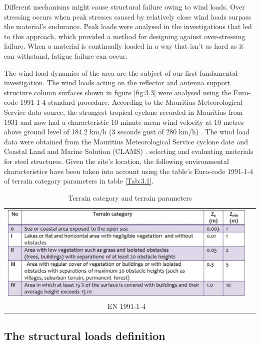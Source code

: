 { Different mechanisms might cause structural failure owing to wind loads. Over stressing occurs when peak stresses caused by relatively close wind loads surpass the material's endurance. Peak loads were analysed in the investigations that led to this approach, which provided a method for designing against over-stressing failure. When a material is continually loaded in a way that isn't as hard as it can withstand, fatigue failure can occur. 
 
The wind load dynamics of the area are the subject of our first fundamental investigation. The wind loads acting on the reflector and antenna support structure column surfaces shown in figure \ref{fig:3.3} were analysed using the Euro-code 1991-1-4 \cite {en19911} standard procedure. According to the Mauritius Meteorological Service data source, the strongest tropical cyclone recorded in Mauritius from 1931 and now had a characteristic 10 minute mean wind velocity at 10 metres above ground level of 184.2 km/h (3 seconds gust of 280 km/h) \cite{mms_2020}. The wind load data were obtained from the Mauritius Meteorological Service cyclone date \cite{mms_2020} and Coastal Land and Marine Solution (CLAMS) \cite{clams_2015}.
selecting and evaluating materials for steel structures. Given the site's location, the following environmental characteristics have been taken into account using the table's Euro-code 1991-1-4 \cite{en19911} of terrain category parameters in table \ref{Tab:3.1}.

\begin{table}[h]
\caption{Terrain category and terrain parameters}
\centering
\begin{tabular}{c r} 
\includegraphics[width=5in]{Figures/Terrian_category.png} \label{Tab:3.1}\\
EN 1991-1-4 \cite{en19911}
\end{tabular}
\label{tab:hresult}
\end{table}

\subsection{The structural loads definition}

}

